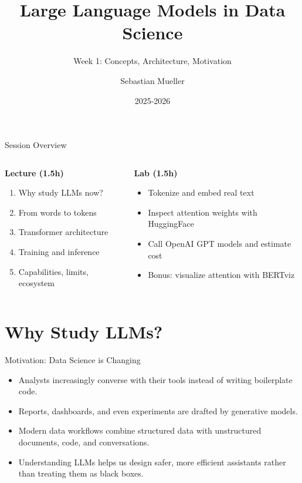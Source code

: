 \documentclass[aspectratio=169]{beamer}
\title{Large Language Models in Data Science}
\subtitle{Week 1: Concepts, Architecture, Motivation}
\author{Sebastian Mueller}
\institute{Aix-Marseille Universit\'e}
\date{2025-2026}
\begin{document}
\begin{frame}[plain]
  \titlepage
\end{frame}

\begin{frame}{Session Overview}
  \begin{columns}[T,onlytextwidth]
    \begin{column}{0.55\linewidth}
      \textbf{Lecture (1.5h)}
      \begin{enumerate}
        \item Why study LLMs now?
        \item From words to tokens
        \item Transformer architecture
        \item Training and inference
        \item Capabilities, limits, ecosystem
      \end{enumerate}
    \end{column}
    \begin{column}{0.4\linewidth}
      \textbf{Lab (1.5h)}
      \begin{itemize}
        \item Tokenize and embed real text
        \item Inspect attention weights with HuggingFace
        \item Call OpenAI GPT models and estimate cost
        \item Bonus: visualize attention with BERTviz
      \end{itemize}
    \end{column}
  \end{columns}
\end{frame}

\section{Why Study LLMs?}

\begin{frame}{Motivation: Data Science is Changing}
  \begin{itemize}
    \item Analysts increasingly converse with their tools instead of writing boilerplate code.
    \item Reports, dashboards, and even experiments are drafted by generative models.
    \item Modern data workflows combine structured data with unstructured documents, code, and conversations.
    \item Understanding LLMs helps us design safer, more efficient assistants rather than treating them as black boxes.
  \end{itemize}
\end{frame}
\end{document}
